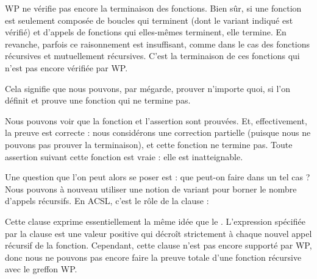 

WP ne vérifie pas encore la terminaison des fonctions. Bien sûr, si
une fonction est seulement composée de boucles qui terminent (dont le variant 
indiqué est vérifié) et d'appels de fonctions qui elles-mêmes terminent, elle
termine. En revanche, parfois ce raisonnement est insuffisant, comme dans le cas
des fonctions récursives et mutuellement récursives. C'est la terminaison de ces
fonctions qui n'est pas encore vérifiée par WP.


Cela signifie que nous pouvons, par mégarde, prouver n'importe quoi, si l'on 
définit et prouve une fonction qui ne termine pas.






Nous pouvons voir que la fonction et l'assertion sont prouvées. Et, effectivement,
la preuve est correcte : nous considérons une correction partielle (puisque nous ne
pouvons pas prouver la terminaison), et cette fonction ne termine pas. Toute
assertion suivant cette fonction est vraie : elle est inatteignable.


Une question que l'on peut alors se poser est : que peut-on faire dans un tel 
cas ? Nous pouvons à nouveau utiliser une notion de variant pour borner le nombre
d'appels récursifs. En ACSL, c'est le rôle de la clause  :




Cette clause exprime essentiellement la même idée que le .
L'expression spécifiée par la clause  est une valeur positive
qui décroît strictement à chaque nouvel appel récursif de la fonction. Cependant,
cette clause n'est pas encore supporté par WP, donc nous ne pouvons pas encore 
faire la preuve totale d'une fonction récursive avec le greffon WP.
